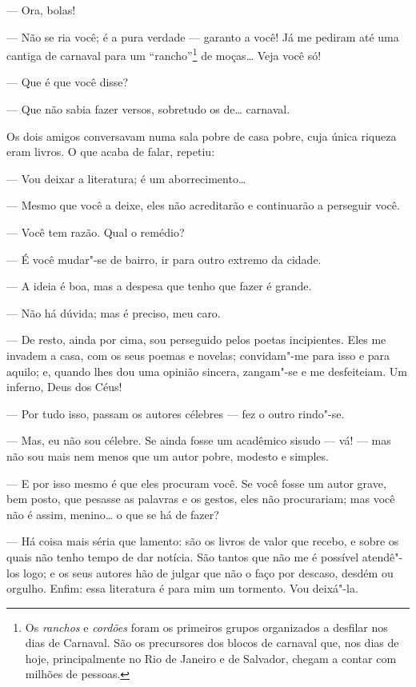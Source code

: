 --- Ora, bolas!

--- Não se ria você; é a pura verdade --- garanto a você! Já me pediram
até uma cantiga de carnaval para um ``rancho''\footnote{Os
  \emph{ranchos} e \emph{cordões} foram os primeiros grupos organizados
  a desfilar nos dias de Carnaval. São os precursores dos blocos de
  carnaval que, nos dias de hoje, principalmente no Rio de Janeiro e de
  Salvador, chegam a contar com milhões de pessoas.} de moças\ldots{} Veja
você só!

--- Que é que você disse?

--- Que não sabia fazer versos, sobretudo os de\ldots{} carnaval.

Os dois amigos conversavam numa sala pobre de casa pobre, cuja única
riqueza eram livros. O que acaba de falar, repetiu:

--- Vou deixar a literatura; é um aborrecimento\ldots{}

--- Mesmo que você a deixe, eles não acreditarão e continuarão a
perseguir você.

--- Você tem razão. Qual o remédio?

--- É você mudar"-se de bairro, ir para outro extremo da cidade.

--- A ideia é boa, mas a despesa que tenho que fazer é grande.

--- Não há dúvida; mas é preciso, meu caro.

--- De resto, ainda por cima, sou perseguido pelos poetas incipientes.
Eles me invadem a casa, com os seus poemas e novelas; convidam"-me para
isso e para aquilo; e, quando lhes dou uma opinião sincera, zangam"-se e
me desfeiteiam. Um inferno, Deus dos Céus!

--- Por tudo isso, passam os autores célebres --- fez o outro rindo"-se.

--- Mas, eu não sou célebre. Se ainda fosse um acadêmico sisudo --- vá! ---
mas não sou mais nem menos que um autor pobre, modesto e simples.

--- E por isso mesmo é que eles procuram você. Se você fosse um autor
grave, bem posto, que pesasse as palavras e os gestos, eles não
procurariam; mas você não é assim, menino\ldots{} o que se há de fazer?

--- Há coisa mais séria que lamento: são os livros de valor que recebo, e
sobre os quais não tenho tempo de dar notícia. São tantos que não me é
possível atendê"-los logo; e os seus autores hão de julgar que não o faço
por descaso, desdém ou orgulho. Enfim: essa literatura é para mim um
tormento. Vou deixá"-la.

